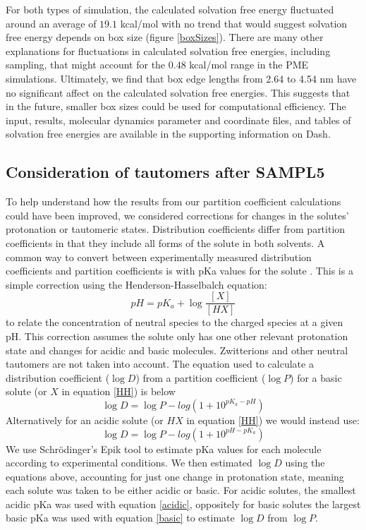For both types of simulation, the calculated solvation free energy fluctuated around an average of $19.1$ kcal/mol with no trend that would suggest solvation free energy depends on box size (figure \ref{boxSizes}).
There are many other explanations for fluctuations in calculated solvation free energies, including sampling, that might account for the $0.48$ kcal/mol range in the PME simulations. 
Ultimately, we find that box edge lengths from 2.64 to 4.54 nm have no significant affect on the calculated solvation free energies. 
This suggests that in the future, smaller box sizes could be used for computational efficiency. 
The input, results, molecular dynamics parameter and coordinate files, and tables of solvation free energies are available in the supporting information on Dash.
\subsection{Consideration of tautomers after SAMPL5}
\label{methods:3}

To help understand how the results from our partition coefficient calculations could have been improved, we considered corrections for changes in the solutes' protonation or tautomeric states.  
Distribution coefficients differ from partition coefficients in that they include all forms of the solute in both solvents. 
A common way to convert between experimentally measured distribution coefficients and partition coefficients is with pKa values for the solute  \cite{Sangster:1989tp}.
This is a simple correction using the Henderson-Hasselbalch 
equation:
\begin{equation}
pH = pK_a + \log \frac{[X]}{[HX]}
\label{HH}
\end{equation}
to relate the concentration of neutral species to the charged species at a given pH. 
This correction assumes the solute only has one other relevant protonation state and changes for acidic and basic molecules. 
Zwitterions and other neutral tautomers are not taken into account. 
The equation used to calculate a distribution coefficient ($\log D$) from a partition coefficient ($\log P$) for a basic solute (or $X$ in equation \ref{HH}) is below  
\begin{equation}
\log D = \log P - log(1+10^{pK_a-pH})
\label{basic}
\end{equation}
Alternatively for an acidic solute (or $HX$ in equation \ref{HH}) we would instead use:
\begin{equation}
\log D = \log P - log(1+10^{pH-pK_a})
\label{acidic}
\end{equation}
We use Schr\"{o}dinger's Epik tool  \cite{epik,Shelley:2007ku,Greenwood:2010hh} to estimate pKa values for each molecule according to experimental conditions. 
We then estimated $\log D$ using the equations above, accounting for just one change in protonation state, meaning each solute was taken to be either acidic or basic.
For acidic solutes, the smallest acidic pKa was used with equation \ref{acidic}, oppositely for basic solutes the largest basic pKa was used with equation \ref{basic} to estimate $\log D$ from $\log P$. 

